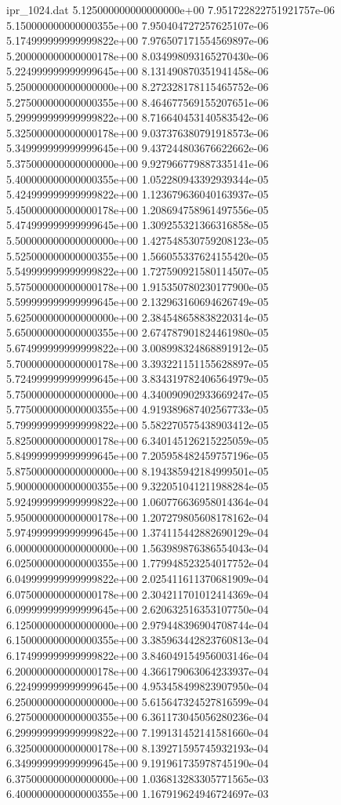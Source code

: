 \begin{filecontents}{ipr_1024.dat}
5.125000000000000000e+00 7.951722822751921757e-06
5.150000000000000355e+00 7.950404727257625107e-06
5.174999999999999822e+00 7.976507171554569897e-06
5.200000000000000178e+00 8.034998093165270430e-06
5.224999999999999645e+00 8.131490870351941458e-06
5.250000000000000000e+00 8.272328178115465752e-06
5.275000000000000355e+00 8.464677569155207651e-06
5.299999999999999822e+00 8.716640453140583542e-06
5.325000000000000178e+00 9.037376380791918573e-06
5.349999999999999645e+00 9.437244803676622662e-06
5.375000000000000000e+00 9.927966779887335141e-06
5.400000000000000355e+00 1.052280943392939344e-05
5.424999999999999822e+00 1.123679636040163937e-05
5.450000000000000178e+00 1.208694758961497556e-05
5.474999999999999645e+00 1.309255321366316858e-05
5.500000000000000000e+00 1.427548530759208123e-05
5.525000000000000355e+00 1.566055337624155420e-05
5.549999999999999822e+00 1.727590921580114507e-05
5.575000000000000178e+00 1.915350780230177900e-05
5.599999999999999645e+00 2.132963160694626749e-05
5.625000000000000000e+00 2.384548658838220314e-05
5.650000000000000355e+00 2.674787901824461980e-05
5.674999999999999822e+00 3.008998324868891912e-05
5.700000000000000178e+00 3.393221151155628897e-05
5.724999999999999645e+00 3.834319782406564979e-05
5.750000000000000000e+00 4.340090902933669247e-05
5.775000000000000355e+00 4.919389687402567733e-05
5.799999999999999822e+00 5.582270575438903412e-05
5.825000000000000178e+00 6.340145126215225059e-05
5.849999999999999645e+00 7.205958482459757196e-05
5.875000000000000000e+00 8.194385942184999501e-05
5.900000000000000355e+00 9.322051041211988284e-05
5.924999999999999822e+00 1.060776636958014364e-04
5.950000000000000178e+00 1.207279805608178162e-04
5.974999999999999645e+00 1.374115442882690129e-04
6.000000000000000000e+00 1.563989876386554043e-04
6.025000000000000355e+00 1.779948523254017752e-04
6.049999999999999822e+00 2.025411611370681909e-04
6.075000000000000178e+00 2.304211701012414369e-04
6.099999999999999645e+00 2.620632516353107750e-04
6.125000000000000000e+00 2.979448396904708744e-04
6.150000000000000355e+00 3.385963442823760813e-04
6.174999999999999822e+00 3.846049154956003146e-04
6.200000000000000178e+00 4.366179063064233937e-04
6.224999999999999645e+00 4.953458499823907950e-04
6.250000000000000000e+00 5.615647324527816599e-04
6.275000000000000355e+00 6.361173045056280236e-04
6.299999999999999822e+00 7.199131452141581660e-04
6.325000000000000178e+00 8.139271595745932193e-04
6.349999999999999645e+00 9.191961735978745190e-04
6.375000000000000000e+00 1.036813283305771565e-03
6.400000000000000355e+00 1.167919624946724697e-03

\end{filecontents}
